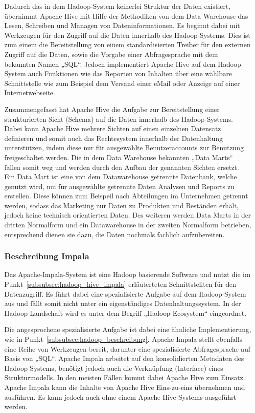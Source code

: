Dadurch das in dem Hadoop-System keinerlei Struktur der Daten existiert,
übernimmt Apache Hive mit Hilfe der Methodiken von dem Data Warehouse das
Lesen, Schreiben und Managen von Dateninformationen. Es beginnt dabei mit
Werkzeugen für den Zugriff auf die Daten innerhalb des Hadoop-Systems. Dies ist
zum einem die Bereitstellung von einem standardisierten Treiber für den
externen Zugriff auf die Daten, sowie die Vorgabe einer Abfragesprache mit dem
bekannten Namen „SQL“. Jedoch implementiert Apache Hive auf dem Hadoop-System
auch Funktionen wie das Reporten von Inhalten über eine wählbare Schnittstelle
wie zum Beispiel dem Versand einer eMail oder Anzeige auf einer
Internetwebseite.

Zusammengefasst hat Apache Hive die Aufgabe zur Bereitstellung einer strukturierten
Sicht (Schema) auf die Daten innerhalb des Hadoop-Systems. Dabei kann Apache
Hive mehrere Sichten auf einen einzelnen Datensatz definieren und somit auch
das Rechtesystem innerhalb der Datenhaltung unterstützen, indem diese nur
für ausgewählte Benutzeraccounts zur Benutzung freigeschaltet werden. Die in
dem Data Warehouse bekannten „Data Marts“ fallen somit weg und werden durch
den Aufbau der genannten Sichten ersetzt. Ein Data Mart ist eine von dem
Datawarehouse getrennte Datenbank, welche genutzt wird, um für ausgewählte
getrennte Daten Analysen und Reports zu erstellen. Diese können zum Beispeil
nach Abteilungen im Unternehmen getrennt werden, sodass das Marketing nur Daten
zu Produkten und Beständen erhält, jedoch keine technisch orientierten Daten.
Des weiteren werden Data Marts in der dritten Normalform und ein Datawarehouse
in der zweiten Normalform betrieben, entsprechend dienen sie dazu, die Daten
nochmals fachlich aufzubereiten.
\nl%

\subsubsection{Beschreibung Impala}
\label{subsubsec:impala_beschreibung}
Das Apache-Impala-System ist eine Hadoop basierende Software und nutzt die
im Punkt~\ref{subsubsec:hadoop_hive_impala} erläuterteten Schnittstellten
für den Datenzugriff. Es führt dabei eine spezialisierte Aufgabe auf dem
Hadoop-System aus und fällt somit nicht unter ein eigenständiges
Datenhaltungssystem. In der Hadoop-Landschaft wird es unter dem Begriff
„Hadoop Ecosystem“ eingeordnet.

Die angesprochene spezialisierte Aufgabe ist dabei eine ähnliche
Implementierung, wie in Punkt~\ref{subsubsec:hadoop_beschreibung}. Apache
Impala stellt ebenfalls eine Reihe von Werkzeugen bereit, darunter eine
spezialisierte Abfragesprache auf Basis von „SQL“. Apache Impala arbeitet auf
den konsolidierten Metadaten des Hadoop-Systems, benötigt jedoch auch die
Verknüpfung (Interface) eines Strukturmodells. In den meisten Fällen kommt
dabei Apache Hive zum Einsatz. Apache Impala kann die Inhalte von Apache Hive
Eins-zu-eins übernehmen und ausführen. Es kann jedoch auch ohne einem Apache
Hive Systems ausgeführt werden.

